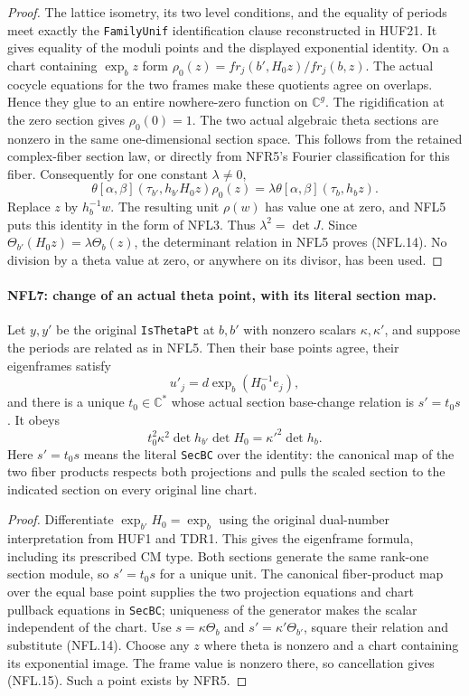 \begin{proof}
The lattice isometry, its two level conditions, and the equality
of periods meet exactly the \texttt{FamilyUnif} identification
clause reconstructed in HUF21.  It gives equality of the
moduli points and the displayed exponential identity.
On a chart containing $\exp_bz$ form
$\rho_0(z)=fr_j(b',H_0z)/fr_j(b,z)$.
The actual cocycle equations for the two frames make these
quotients agree on overlaps.  Hence they glue to an entire
nowhere-zero function on $\mathbb C^g$.  The rigidification at
the zero section gives $\rho_0(0)=1$.
The two actual algebraic theta sections are nonzero in the same
one-dimensional section space.  This follows from the retained
complex-fiber section law, or directly from NFR5's Fourier
classification for this fiber.  Consequently for one constant
$\lambda\ne0$,
\[
 \theta[\alpha,\beta](\tau_{b'},h_{b'}H_0z)\rho_0(z)
       =\lambda\theta[\alpha,\beta](\tau_b,h_bz).
\]
Replace $z$ by $h_b^{-1}w$.  The resulting unit $\rho(w)$ has
value one at zero, and NFL5 puts this identity in the form of
NFL3.  Thus $\lambda^2=\det J$.
Since $\Theta_{b'}(H_0z)=\lambda\Theta_b(z)$, the determinant
relation in NFL5 proves (NFL.14).  No division by a theta value
at zero, or anywhere on its divisor, has been used.
\end{proof}

\paragraph{NFL7: change of an actual theta point, with its literal section map.}
\label{claim:NFL7}
Let $y,y'$ be the original \texttt{IsThetaPt} at $b,b'$ with
nonzero scalars $\kappa,\kappa'$, and suppose the periods are
related as in NFL5.  Then their base points agree, their eigenframes
satisfy
\[
 u'_j=d\exp_b(H_0^{-1}e_j),
\]
and there is a unique $t_0\in\mathbb C^*$ whose actual section
base-change relation is $s'=t_0s$.  It obeys
\[
 t_0^2\kappa^2\det h_{b'}\det H_0
       =\kappa'^2\det h_b.
 \tag{NFL.15}
\]
Here $s'=t_0s$ means the literal \texttt{SecBC} over the identity:
the canonical map of the two fiber products respects both
projections and pulls the scaled section to the indicated section
on every original line chart.

\begin{proof}
Differentiate $\exp_{b'}H_0=\exp_b$ using the original
dual-number interpretation from HUF1 and TDR1.  This gives the
eigenframe formula, including its prescribed CM type.
Both sections generate the same rank-one section module, so
$s'=t_0s$ for a unique unit.  The canonical fiber-product map
over the equal base point supplies the two projection equations
and chart pullback equations in \texttt{SecBC}; uniqueness of
the generator makes the scalar independent of the chart.
Use $s=\kappa\Theta_b$ and $s'=\kappa'\Theta_{b'}$, square their
relation and substitute (NFL.14).  Choose any $z$ where theta
is nonzero and a chart containing its exponential image.
The frame value is nonzero there, so cancellation gives
(NFL.15).  Such a point exists by NFR5.
\end{proof}

